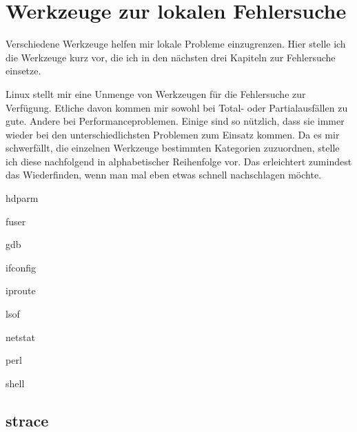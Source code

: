 \chapter{Werkzeuge zur lokalen Fehlersuche}
\label{cha:lokal-werkzeuge}

\begin{abstractsec}
  Verschiedene Werkzeuge helfen mir lokale Probleme einzugrenzen. Hier stelle
  ich die Werkzeuge kurz vor, die ich in den nächsten drei Kapiteln zur
  Fehlersuche einsetze.
\end{abstractsec}

\begin{normaltext}
  Linux stellt mir eine Unmenge von Werkzeugen für die Fehlersuche zur
  Verfügung. Etliche davon kommen mir sowohl bei Total- oder Partialausfällen
  zu gute. Andere bei Performanceproblemen. Einige sind so nützlich, dass sie
  immer wieder bei den unterschiedlichsten Problemen zum Einsatz kommen. Da
  es mir schwerfällt, die einzelnen Werkzeuge bestimmten Kategorien
  zuzuordnen, stelle ich diese nachfolgend in alphabetischer Reihenfolge vor.
  Das erleichtert zumindest das Wiederfinden, wenn man mal eben etwas schnell
  nachschlagen möchte.
\end{normaltext}

\begin{notes}
\item hdparm
\item fuser
\item gdb
\item ifconfig
\item iproute
\item lsof
\item netstat
\item perl
\item shell
\end{notes}

\section{strace}

